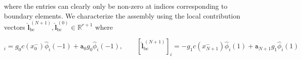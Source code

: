 where the entries can clearly only be non-zero at indices corresponding to
boundary elements.
We characterize the assembly using the local contribution vectors
$\widehat{\textbf{l}}_{\text{bc}}^{\,(N+1)}, \widehat{\textbf{l}}_{\text{bc}}^{\,(0)} \in \mathbb{R}^{r+1}$
where

\begin{equation*}
	[\widehat{\textbf{l}}_{\text{bc}}^{\,(0)}]_{i} = g_0c(x_{0}^-) \widehat{\phi}_i(-1) + \texttt{a}_{0}g_0\widehat{\phi}_i(-1), \qquad
	[\widehat{\textbf{l}}_{\text{bc}}^{\,(N+1)}]_{i} = -g_1c(x_{N+1}^-) \widehat{\phi}_i(1) + \texttt{a}_{N+1}g_1\widehat{\phi}_i(1)
\end{equation*}